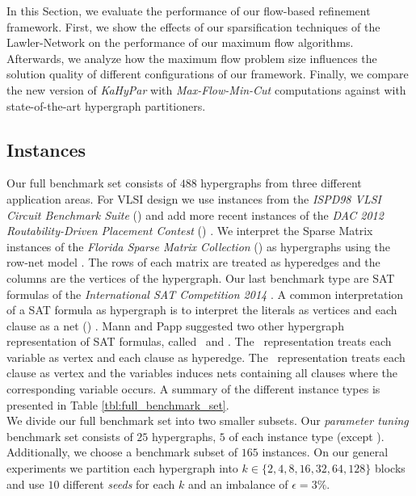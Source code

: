 In this Section, we evaluate the performance of our flow-based refinement framework. 
First, we show the effects of our sparsification techniques of the Lawler-Network 
\cite{lawler1973} on the performance of our maximum flow algorithms.
Afterwards, we analyze how the maximum
flow problem size influences the solution quality of different configurations of
our framework. Finally, we compare the new version of \emph{KaHyPar} with
\emph{Max-Flow-Min-Cut} computations against with
state-of-the-art hypergraph partitioners.


\subsection{Instances}

Our full benchmark set consists of $488$ hypergraphs from three different 
application areas. For VLSI design we use instances from
the \emph{ISPD98 VLSI Circuit Benchmark Suite} (\ISPD) \cite{alpert1998ispd98} and add more recent
instances of the \emph{DAC 2012 Routability-Driven Placement Contest} (\DAC) \cite{viswanathan2012dac}.
We interpret the Sparse Matrix instances of the \emph{Florida Sparse Matrix 
Collection} (\SPM) \cite{davis2011university} as hypergraphs using the row-net model \cite{catalyurek1999hypergraph}.
The rows of each matrix are treated as hyperedges and the columns are the vertices of
the hypergraph. Our last benchmark type are SAT formulas of the \emph{International SAT
Competition 2014} \cite{belov2014application}. A common interpretation of a SAT formula 
as hypergraph is to interpret the literals as vertices and each clause as a net (\Literal) \cite{papa2007hypergraph}.
Mann and Papp \cite{mann2014formula} suggested two other hypergraph representation of
SAT formulas, called \Primal~and \Dual. The \Primal~representation treats each variable
as vertex and each clause as hyperedge. The \Dual~representation treats each clause as
vertex and the variables induces nets containing all clauses where the corresponding
variable occurs. A summary of the different instance types is presented in
Table \ref{tbl:full_benchmark_set}. \\
We divide our full benchmark set into two smaller subsets. Our \emph{parameter tuning}
benchmark set consists of $25$ hypergraphs, $5$ of each instance type (except \DAC). Additionally,
we choose a benchmark subset of $165$ instances. On our general experiments we partition
each hypergraph into $k \in \{2,4,8,16,32,64,128\}$ blocks and use $10$ different
\emph{seeds} for each $k$ and an imbalance of $\epsilon = 3\%$.

